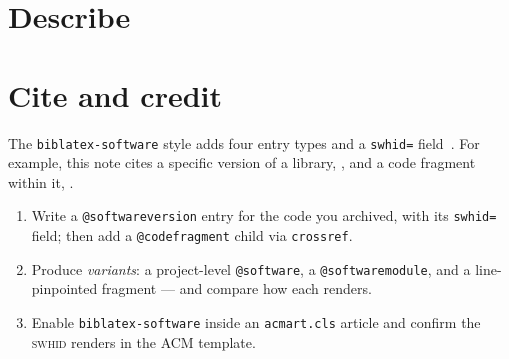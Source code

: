 
\section{Describe}


\section{Cite and credit}
The \texttt{biblatex-software} style adds four entry types and a \texttt{swhid=}
field~\autocite{DiCosmoSEN2020,cise-2020-doi}. For example, this note cites a specific
version of a library, \autocite{parmap-1.1.1}, and a code fragment within
it, \autocite{simplemapper}.

\begin{handson}
\begin{enumerate}[nosep,leftmargin=*]
  \item Write a \texttt{@softwareversion} entry for the code you archived, with its
        \texttt{swhid=} field; then add a \texttt{@codefragment} child via \texttt{crossref}.
  \item Produce \emph{variants}: a project-level \texttt{@software}, a \texttt{@softwaremodule},
        and a line-pinpointed fragment --- and compare how each renders.
  \item Enable \texttt{biblatex-software} inside an \texttt{acmart.cls} article and confirm the
        \textsc{swhid} renders in the ACM template.
\end{enumerate}
\end{handson}
